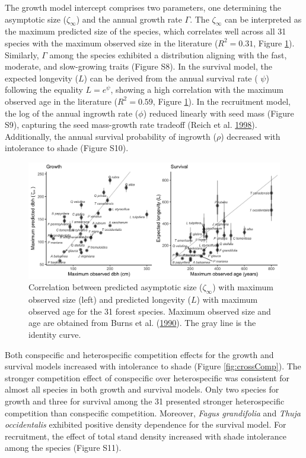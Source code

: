 \documentclass[12pt]{article}
\begin{document}
The growth model intercept comprises two parameters, one determining the
asymptotic size (\(\zeta_{\infty}\)) and the annual growth rate
\(\Gamma\). The \(\zeta_{\infty}\) can be interpreted as the maximum
predicted size of the species, which correlates well across all 31
species with the maximum observed size in the literature
(\(R^2 = 0.31\), Figure \ref{fig:crossGrowthSurv}). Similarly,
\(\Gamma\) among the species exhibited a distribution aligning with the
fast, moderate, and slow-growing traits (Figure S8). In the survival
model, the expected longevity (\(L\)) can be derived from the annual
survival rate ( \(\psi\)) following the equality \(L = e^{\psi}\),
showing a high correlation with the maximum observed age in the
literature (\(R^2 = 0.59\), Figure \ref{fig:crossGrowthSurv}). In the
recruitment model, the log of the annual ingrowth rate (\(\phi\))
reduced linearly with seed mass (Figure S9), capturing the seed
mass-growth rate tradeoff (Reich et al.
\protect\hyperlink{ref-Reich1998}{1998}). Additionally, the annual
survival probability of ingrowth (\(\rho\)) decreased with intolerance
to shade (Figure S10).

\begin{figure}
\hypertarget{fig:crossGrowthSurv}{%
\centering
\includegraphics[width=1\textwidth,height=\textheight]{manuscript/figs/crossGrowthSurv.png}
\caption{Correlation between predicted asymptotic size
(\(\zeta_{\infty}\)) with maximum observed size (left) and predicted
longevity (\(L\)) with maximum observed age for the 31 forest species.
Maximum observed size and age are obtained from Burns et al.
(\protect\hyperlink{ref-burns1990silvics}{1990}). The gray line is the
identity curve.}\label{fig:crossGrowthSurv}
}
\end{figure}

Both conspecific and heterospecific competition effects for the growth
and survival models increased with intolerance to shade (Figure
\ref{fig:crossComp}). The stronger competition effect of conspecific
over heterospecific was consistent for almost all species in both growth
and survival models. Only two species for growth and three for survival
among the 31 presented stronger heterospecific competition than
conspecific competition. Moreover, \emph{Fagus grandifolia} and
\emph{Thuja occidentalis} exhibited positive density dependence for the
survival model. For recruitment, the effect of total stand density
increased with shade intolerance among the species (Figure S11).
\end{document}
